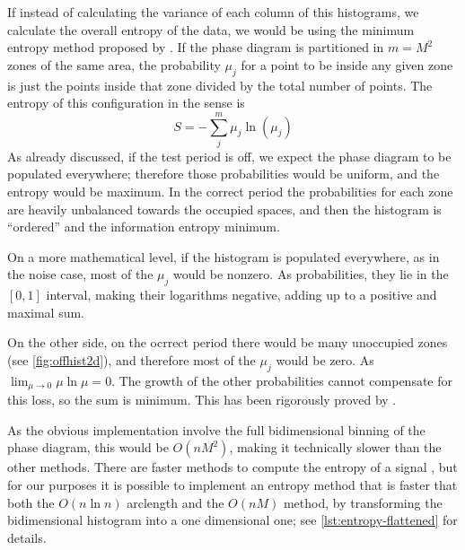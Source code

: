 	If instead of calculating the variance of each column of this histograms,
	we calculate the overall entropy of the data, we would be using the minimum entropy method proposed by \cite{Cincotta1995I}.
	If the phase diagram is partitioned in $m=M^2$ zones of the same area, 
	the probability $\mu_j$ for a point to be inside any given zone is just the points inside that zone divided by the total number of points.
	The entropy of this configuration in the \cite{Shannon1948} sense is 
	\begin{equation}
		S = - \sum_j^m \mu_j \ln(\mu_j) \label{eq:entropy}
	\end{equation}
	As already discussed, if the test period is off, we expect the phase diagram to be populated everywhere; 
	therefore those probabilities would be uniform, and the entropy would be maximum.
	In the correct period the probabilities for each zone are heavily unbalanced towards the occupied spaces,
	and then the histogram is \enquote{ordered} and the information entropy minimum.
	
	On a more mathematical level, if the histogram is populated everywhere, as in the noise case, 
	most of the $\mu_j$ would be nonzero. As probabilities, they lie in the $[0,1]$ interval, 
	making their logarithms negative, adding up to a positive and maximal sum.
	
	On the other side, on the ocrrect period there would be many unoccupied zones (see \autoref{fig:offhist2d}), 
	and therefore most of the $\mu_j$ would be zero. As $\lim_{\mu\to0}\mu \ln \mu = 0$.
	The growth of the other probabilities cannot compensate for this loss, so the sum is minimum.	
	This has been rigorously proved by \cite{Cincotta1999II}.

	As the obvious implementation involve the full bidimensional binning of the phase diagram, 
	this would be $O(nM^2)$, making it technically slower than the other methods.
	There are faster methods to compute the entropy of a signal \citep{Cohen1985}, 
	but for our purposes it is possible to implement an entropy method that is faster that both 
	the $O(n\ln n)$ arclength and the $O(nM)$ method, by transforming the bidimensional histogram into a one dimensional one;
	see \autoref{lst:entropy-flattened} for details.
	
